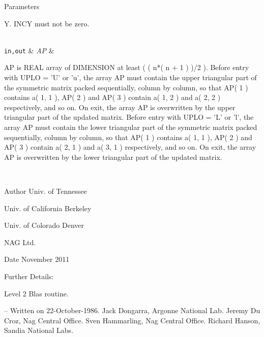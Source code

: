 \begin{DoxyParams}[1]{Parameters}
\begin{DoxyVerb}
           Y. INCY must not be zero.\end{DoxyVerb}
\\
\hline
\mbox{\tt in,out}  & {\em A\+P} & \begin{DoxyVerb}          AP is REAL array of DIMENSION at least
           ( ( n*( n + 1 ) )/2 ).
           Before entry with  UPLO = 'U' or 'u', the array AP must
           contain the upper triangular part of the symmetric matrix
           packed sequentially, column by column, so that AP( 1 )
           contains a( 1, 1 ), AP( 2 ) and AP( 3 ) contain a( 1, 2 )
           and a( 2, 2 ) respectively, and so on. On exit, the array
           AP is overwritten by the upper triangular part of the
           updated matrix.
           Before entry with UPLO = 'L' or 'l', the array AP must
           contain the lower triangular part of the symmetric matrix
           packed sequentially, column by column, so that AP( 1 )
           contains a( 1, 1 ), AP( 2 ) and AP( 3 ) contain a( 2, 1 )
           and a( 3, 1 ) respectively, and so on. On exit, the array
           AP is overwritten by the lower triangular part of the
           updated matrix.\end{DoxyVerb}
 \\
\hline
\end{DoxyParams}
\begin{DoxyAuthor}{Author}
Univ. of Tennessee 

Univ. of California Berkeley 

Univ. of Colorado Denver 

N\+A\+G Ltd. 
\end{DoxyAuthor}
\begin{DoxyDate}{Date}
November 2011 
\end{DoxyDate}
\begin{DoxyParagraph}{Further Details\+: }
\begin{DoxyVerb}  Level 2 Blas routine.

  -- Written on 22-October-1986.
     Jack Dongarra, Argonne National Lab.
     Jeremy Du Croz, Nag Central Office.
     Sven Hammarling, Nag Central Office.
     Richard Hanson, Sandia National Labs.\end{DoxyVerb}
 
\end{DoxyParagraph}
\hypertarget{group__single__blas__level2_gabbe9933ddf6f0137156d4f2491f2afdb}{}
